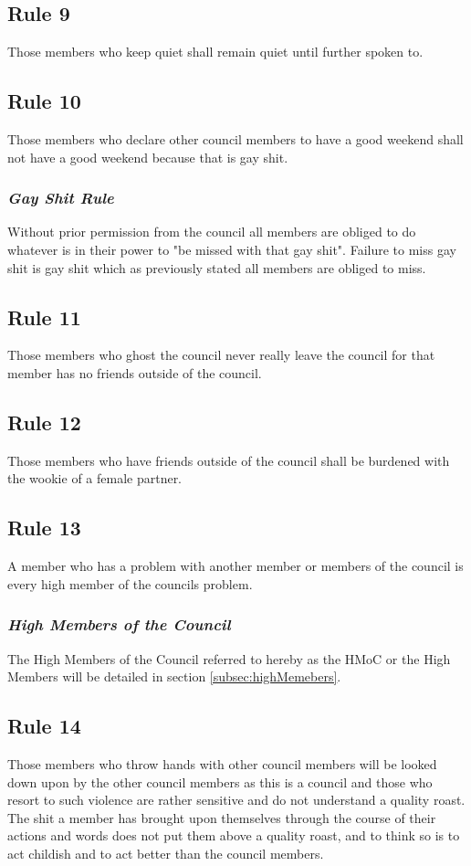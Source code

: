 \documentclass[]{article}
\begin{document}
\subsection{Rule 9}
Those members who keep quiet shall remain quiet until further spoken to.

\subsection{Rule 10}
Those members who declare other council members to have a good weekend shall not have a good weekend because that is gay shit.
\subsubsection{\textit{Gay Shit Rule}}
Without prior permission from the council all members are obliged to do whatever is in their power to "be missed with that gay shit". Failure to miss gay shit is gay shit which as previously stated all members are obliged to miss.

\subsection{Rule 11}
Those members who ghost the council never really leave the council for that member has no friends outside of the council.

\subsection{Rule 12}
Those members who have friends outside of the council shall be burdened with the wookie of a female partner.

\subsection{Rule 13}
A member who has a problem with another member or members of the council is every high member of the councils problem.
\subsubsection{\textit{High Members of the Council}}
The High Members of the Council referred to hereby as the HMoC or the High Members will be detailed in section \ref{subsec:highMemebers}.

\subsection{Rule 14}
Those members who throw hands with other council members will be looked down upon by the other council members as this is a council and those who resort to such violence are rather sensitive and do not understand a quality roast. The shit a member has brought upon themselves through the course of their actions and words does not put them above a quality roast, and to think so is to act childish and to act better than the council members.
\end{document}
